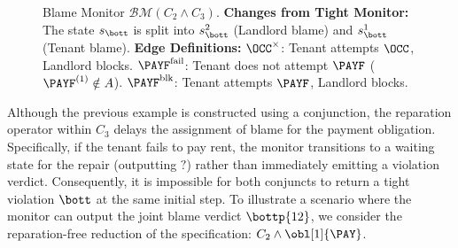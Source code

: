 \begin{example}
\begin{figure}[h!]
      \caption{Blame Monitor $\mathcal{BM}(C_2 \wedge C_3)$.
      \textbf{Changes from Tight Monitor:}
      The state $s_{\bott}$ is split into $s_{\bott}^2$ (Landlord blame) and $s_{\bott}^1$ (Tenant blame).
      \textbf{Edge Definitions:}
      $\OCC^\times$: Tenant attempts $\OCC$, Landlord blocks.
     $\PAYF^{\text{fail}}$: Tenant does not attempt $\PAYF$ ($\PAYF^{(1)} \notin A$).
      $\PAYF^{\text{blk}}$: Tenant attempts $\PAYF$, Landlord blocks.
      }
      \label{fig:blame-monitor}
      \end{figure}
      \end{example}

      Although the previous example is constructed using a conjunction, the reparation operator within $C_3$ delays the assignment of blame for the payment obligation.
Specifically, if the tenant fails to pay rent, the monitor transitions to a waiting state for the repair (outputting $\mathsf{?}$) rather than immediately emitting a violation verdict.
Consequently, it is impossible for both conjuncts to return a tight violation $\bott$ at the same initial step.
To illustrate a scenario where the monitor can output the joint blame verdict $\bottp{12}$, we consider the reparation-free reduction of the specification: $C_2 \wedge \obl[1]{\PAY}$.

